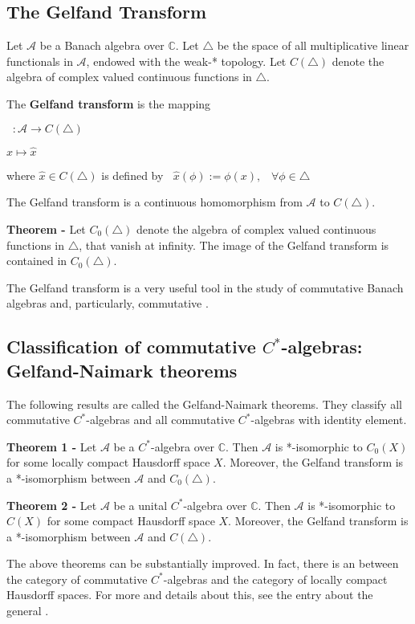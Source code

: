 \documentclass[12pt]{article}
\begin{document}
\subsection*{The Gelfand Transform} Let $\mathcal{A}$ be a Banach algebra over $\mathbb{C}$.
 Let $\bigtriangleup$ be the space of all
 multiplicative linear functionals in $\mathcal{A}$, endowed with the weak-* topology. Let
 $C(\bigtriangleup)$ denote the algebra of complex valued continuous functions in $\bigtriangleup$.

The {\bf Gelfand transform} is the mapping
\begin{center}

$\widehat{}\;\;:\mathcal{A} \longrightarrow C(\bigtriangleup)$

$x \longmapsto \widehat{x}$
\end{center}

where $\widehat{x} \in C(\bigtriangleup)$ is defined by
 $\;\;\widehat{x} (\phi) := \phi(x), \;\;\;\forall \phi \in \bigtriangleup$

The Gelfand transform is a continuous homomorphism from $\mathcal{A}$ to $C(\bigtriangleup)$.

{\bf Theorem -} Let $C_{0}(\bigtriangleup)$ denote the algebra of complex valued continuous functions in $\bigtriangleup$, that vanish at infinity.
 The image of the Gelfand transform is contained in $C_{0}(\bigtriangleup)$.


The Gelfand transform is a very useful tool in the study of commutative Banach algebras and, particularly,
 commutative .

\subsection*{Classification of commutative $C^*$-algebras: Gelfand-Naimark theorems}

The following results are called the Gelfand-Naimark theorems. They classify all commutative $C^*$-algebras and all commutative $C^*$-algebras with identity element.

{\bf Theorem 1 -} Let $\mathcal{A}$ be a $C^*$-algebra over $\mathbb{C}$. Then $\mathcal{A}$ is
 *-isomorphic to $C_{0}(X)$ for some locally compact Hausdorff space $X$. Moreover, the Gelfand transform is a
 *-isomorphism between $\mathcal{A}$ and $C_{0}(\bigtriangleup)$.

{\bf Theorem 2 -} Let $\mathcal{A}$ be a unital $C^*$-algebra over $\mathbb{C}$. Then $\mathcal{A}$ is
 *-isomorphic to $C(X)$ for some compact Hausdorff space $X$. Moreover, the Gelfand transform is a
 *-isomorphism between $\mathcal{A}$ and $C(\bigtriangleup)$.

The above theorems can be substantially improved. In fact, there is an  between the category of commutative $C^*$-algebras and the category of locally compact Hausdorff spaces. For more  and details about this, see the entry about the general .
\end{document}
